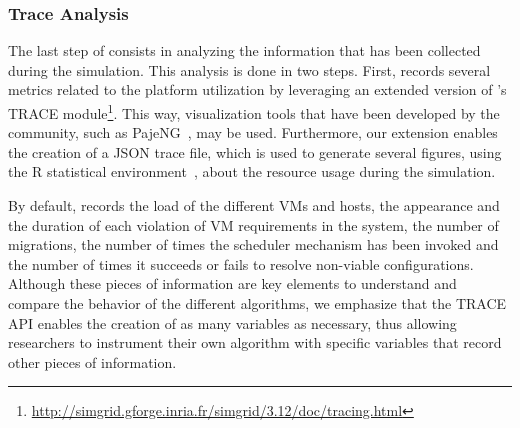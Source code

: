 \vspace*{-.4cm}
\subsubsection{Trace Analysis}
\label{subsec:traces-analysis}

The last step of \vmps consists in analyzing the information that has
been collected during the simulation.
This analysis is done in two steps. First, \vmps records several
metrics related to the platform utilization %
by leveraging an extended version of \sg's TRACE
module\footnote{\url{http://simgrid.gforge.inria.fr/simgrid/3.12/doc/tracing.html}}.
This way, visualization tools that have been developed by the \sg
community, such as PajeNG~\cite{pageng:www}, may be used. Furthermore,
our extension enables the creation of a JSON trace file, which is used to generate several figures, using the R
statistical environment~\cite{R:Bloomfield:2014},
about the resource usage during the simulation.

By default, \vmps records the load of the different VMs and hosts, the
appearance and the duration of each violation of VM requirements in
the system, the number of migrations, the number of times the
scheduler mechanism has been invoked and the number of times it
succeeds or fails to resolve non-viable configurations.
%
Although these pieces of information are key elements to understand
and compare the behavior of the different algorithms, we emphasize
that the TRACE API enables the creation of as many variables as
necessary, thus allowing researchers to instrument their own algorithm
with specific variables that record other pieces of information.
